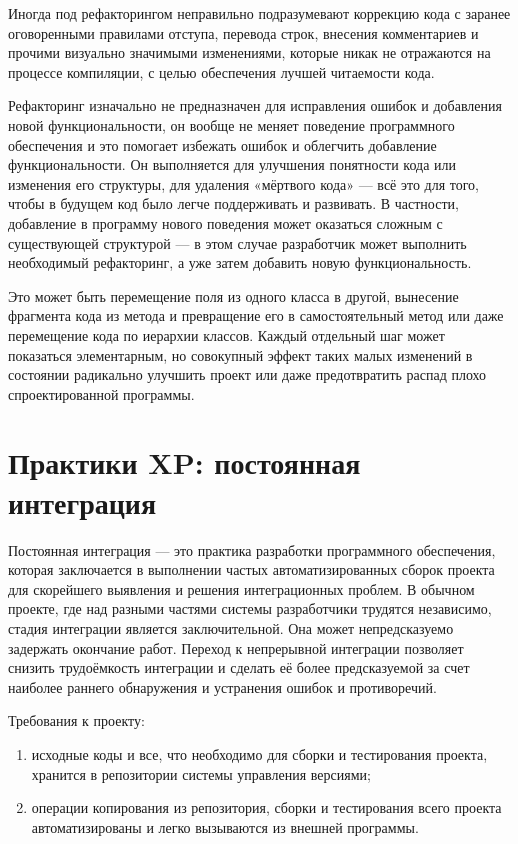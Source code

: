 \documentclass{article}
\let\stdsection\section
\renewcommand\section{\newpage\stdsection}
\begin{document}
    Иногда под рефакторингом неправильно подразумевают коррекцию кода с заранее оговоренными правилами отступа, перевода строк, внесения комментариев и прочими визуально значимыми изменениями, которые никак не отражаются на процессе компиляции, с целью обеспечения лучшей читаемости кода.

    Рефакторинг изначально не предназначен для исправления ошибок и добавления новой функциональности, он вообще не меняет поведение программного обеспечения и это помогает избежать ошибок и облегчить добавление функциональности. Он выполняется для улучшения понятности кода или изменения его структуры, для удаления «мёртвого кода» — всё это для того, чтобы в будущем код было легче поддерживать и развивать. В частности, добавление в программу нового поведения может оказаться сложным с существующей структурой — в этом случае разработчик может выполнить необходимый рефакторинг, а уже затем добавить новую функциональность.

    Это может быть перемещение поля из одного класса в другой, вынесение фрагмента кода из метода и превращение его в самостоятельный метод или даже перемещение кода по иерархии классов. Каждый отдельный шаг может показаться элементарным, но совокупный эффект таких малых изменений в состоянии радикально улучшить проект или даже предотвратить распад плохо спроектированной программы.

\section{Практики XP: постоянная интеграция}
    Постоянная интеграция — это практика разработки программного обеспечения, которая заключается в выполнении частых автоматизированных сборок проекта для скорейшего выявления и решения интеграционных проблем. В обычном проекте, где над разными частями системы разработчики трудятся независимо, стадия интеграции является заключительной. Она может непредсказуемо задержать окончание работ. Переход к непрерывной интеграции позволяет снизить трудоёмкость интеграции и сделать её более предсказуемой за счет наиболее раннего обнаружения и устранения ошибок и противоречий.

    Требования к проекту:
    \begin{enumerate}
        \item исходные коды и все, что необходимо для сборки и тестирования проекта, хранится в репозитории системы управления версиями;
        \item операции копирования из репозитория, сборки и тестирования всего проекта автоматизированы и легко вызываются из внешней программы.
    \end{enumerate}
\end{document}
